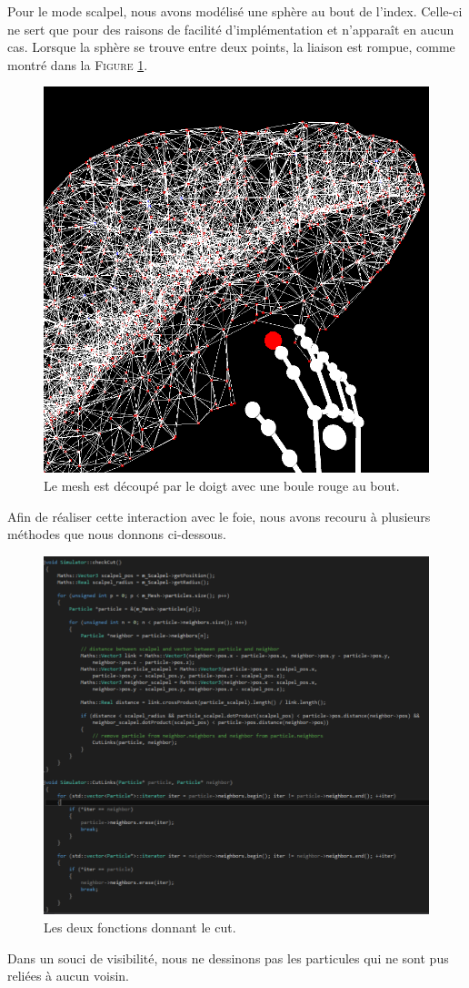 \documentclass[a4paper,12pt]{article}
\begin{document}
Pour le mode \og{}scalpel\fg{}, nous avons modélisé une sphère au bout de l'index. Celle-ci ne sert que pour des raisons de facilité d'implémentation et n'apparaît en aucun cas. Lorsque la sphère se trouve entre deux points, la liaison est rompue, comme montré dans la \textsc{Figure} \ref{fig:cut}.

\begin{figure}
  \centering
  \includegraphics{images/cut_scalpel.png}
  \caption{Le mesh est découpé par le doigt avec une boule rouge au bout.}
  \label{fig:cut}
\end{figure}

Afin de réaliser cette interaction avec le foie, nous avons recouru à plusieurs méthodes que nous donnons ci-dessous.
\begin{figure}
  \centering
  \includegraphics{images/cut_algo.png}
  \caption{Les deux fonctions donnant le cut.}
  \label{fig:cut_algo}
\end{figure}

Dans un souci de visibilité, nous ne dessinons pas les particules qui ne sont pus reliées à aucun voisin. 
\end{document}
